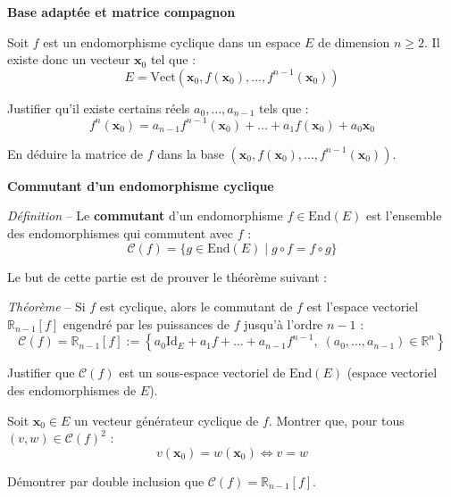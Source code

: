\documentclass[10pt,a4paper]{article}
\begin{document}
\bigskip
\textbf{Base adaptée et matrice compagnon}

Soit $f$ est un endomorphisme cyclique dans un espace $E$ de dimension $n \geq 2$. Il
existe donc un vecteur $\mathbf{x}_0$ tel que :
\[
E = \mathrm{Vect}(\mathbf{x}_0, f(\mathbf{x}_0), \dots, f^{n-1}(\mathbf{x}_0))
\]

\q Justifier qu'il existe certains réels $a_0, \dots, a_{n-1}$ tels que :
\[
f^n(\mathbf{x}_0) = a_{n-1}f^{n-1}(\mathbf{x}_0) + \dots + a_1 f(\mathbf{x}_0) + a_0 \mathbf{x}_0
\]

\q En déduire la matrice de $f$ dans la base $(\mathbf{x}_0, f(\mathbf{x}_0), \dots,
f^{n-1}(\mathbf{x}_0))$.

\bigskip
\textbf{Commutant d'un endomorphisme cyclique}

\textit{Définition} -- Le \textbf{commutant} d'un endomorphisme $f \in \mathrm{End}(E)$ est
l'ensemble des endomorphismes qui commutent avec $f$ :
\[
\mathscr{C}(f) = \{ g \in \mathrm{End}(E) \mid g \circ f = f \circ g \}
\]

Le but de cette partie est de prouver le théorème suivant :

\textit{Théorème} -- Si $f$ est cyclique, alors le commutant de $f$ est l'espace vectoriel $\mathbb{R}_{n-1}[f]$ engendré
par les puissances de $f$ jusqu'à l'ordre $n - 1$ :
\[
\mathscr{C}(f) = \mathbb{R}_{n-1}[f] := \left\{ a_0 \mathrm{Id}_E + a_1 f + \dots + a_{n-1} f^{n-1}, \; (a_0, \dots, a_{n-1}) \in \mathbb{R}^n \right\}
\]

\q Justifier que $\mathscr{C}(f)$ est un sous-espace vectoriel de \(\mathrm{End}(E)\) (espace
vectoriel des endomorphismes de $E$).

\q Soit $\mathbf{x}_0 \in E$ un vecteur générateur cyclique de $f$.
Montrer que, pour tous $(v, w) \in \mathscr{C}(f)^2$ :
\[
v(\mathbf{x}_0) = w(\mathbf{x}_0) \iff v = w
\]

\q Démontrer par double inclusion que $\mathscr{C}(f) = \mathbb{R}_{n-1}[f]$.
\end{document}
